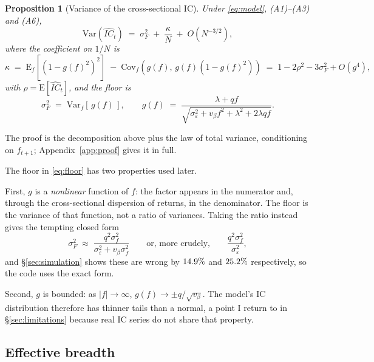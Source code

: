 \documentclass[11pt,a4paper]{article}
\newtheorem{proposition}{Proposition}
\newcommand{\ICh}{\widehat{IC}}
\newcommand{\sF}{\sigma_F}
\begin{document}
\begin{proposition}[Variance of the cross-sectional IC]\label{prop:main}
Under \eqref{eq:model}, (A1)--(A3) and (A6),
\begin{equation}
\mathrm{Var}(\ICh_t) \;=\; \sF^2 \;+\; \frac{\kappa}{N} \;+\; O(N^{-3/2}),
\label{eq:main}
\end{equation}
where the coefficient on $1/N$ is
\begin{equation}
\kappa \;=\; \mathrm{E}_f\!\left[\left(1-g(f)^2\right)^2\right]
\;-\; \mathrm{Cov}_f\!\left(g(f),\, g(f)\left(1-g(f)^2\right)\right)
\;=\; 1 - 2\rho^2 - 3\sF^2 + O(g^4),
\label{eq:kappa}
\end{equation}
with $\rho = \mathrm{E}[\ICh_t]$, and the floor is
\begin{equation}
\sF^2 \;=\; \mathrm{Var}_f\!\left[\, g(f) \,\right],
\qquad
g(f) \;=\; \frac{\lambda + q f}{\sqrt{\sigma_\varepsilon^2 + v_\beta f^2 + \lambda^2 + 2\lambda q f}} .
\label{eq:floor}
\end{equation}
\end{proposition}

\noindent
The proof is the decomposition above plus the law of total variance, conditioning on
$f_{t+1}$; Appendix~\ref{app:proof} gives it in full.

The floor in \eqref{eq:floor} has two properties used later.

First, $g$ is a \emph{nonlinear} function of $f$: the factor appears in the numerator and,
through the cross-sectional dispersion of returns, in the denominator. The floor is the
variance of that function, not a ratio of variances. Taking the ratio instead gives the
tempting closed form
\begin{equation}
\sF^2 \;\approx\; \frac{q^2\sigma_f^2}{\sigma_\varepsilon^2 + v_\beta\sigma_f^2}
\qquad\text{or, more crudely,}\qquad
\frac{q^2\sigma_f^2}{\sigma_\varepsilon^2},
\label{eq:closedforms}
\end{equation}
and \S\ref{sec:simulation} shows these are wrong by $14.9\%$ and
$25.2\%$ respectively, so the code uses the exact form.

Second, $g$ is bounded: as $|f|\to\infty$, $g(f) \to \pm q/\sqrt{v_\beta}$. The
model's IC distribution therefore has thinner tails than a normal, a point I return to
in \S\ref{sec:limitations} because real IC series do not share that property.

\subsection{Effective breadth}\label{sec:neff}
\end{document}
